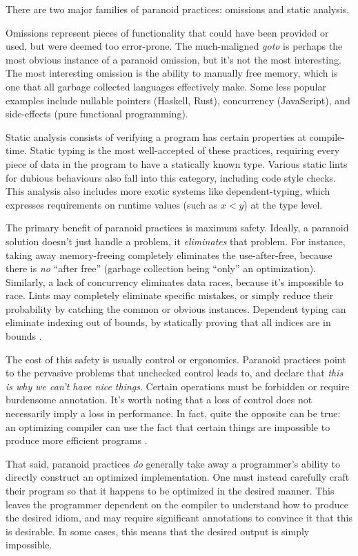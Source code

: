 There are two major families of paranoid practices: omissions and static analysis.

Omissions represent pieces of functionality that could have been provided or
used, but were deemed too error-prone. The much-maligned \emph{goto} is perhaps
the most obvious instance of a paranoid omission, but it's not the most
interesting. The most interesting omission is the ability to manually free memory,
which is one that all garbage collected languages effectively make.
Some less popular examples include nullable pointers (Haskell, Rust),
concurrency (JavaScript), and side-effects (pure functional programming).

Static analysis consists of verifying a program has certain properties at
compile-time. Static typing is the most well-accepted of these practices,
requiring every piece of data in the program to have a statically known type.
Various static lints for dubious behaviours also fall into this category,
including code style checks. This analysis also includes more exotic systems
like dependent-typing, which expresses requirements on runtime values (such as
$x < y$) at the type level.

The primary benefit of paranoid practices is maximum safety. Ideally, a paranoid
solution doesn't just handle a problem, it \emph{eliminates} that problem. For
instance, taking away memory-freeing completely eliminates the use-after-free,
because there is \emph{no} ``after free'' (garbage collection being ``only'' an
optimization). Similarly, a lack of concurrency eliminates data races, because
it's impossible to race. Lints may completely eliminate specific mistakes, or
simply reduce their probability by catching the common or obvious instances.
Dependent typing can eliminate indexing out of bounds, by statically proving
that all indices are in bounds \cite{xi1998eliminating}.

The cost of this safety is usually control or ergonomics. Paranoid practices
point to the pervasive problems that unchecked control leads to, and declare
that \emph{this is why we can't have nice things}. Certain operations must be
forbidden or require burdensome annotation. It's worth noting that a loss of
control does not necessarily imply a loss in performance. In fact, quite the
opposite can be true: an optimizing compiler can use the fact that certain
things are impossible to produce more efficient programs
\cite{coutts2007stream}.

That said, paranoid practices \emph{do} generally take away a programmer's ability to
directly construct an optimized implementation. One must instead carefully craft
their program so that it happens to be optimized in the desired manner. This
leaves the programmer dependent on the compiler to understand how to produce the
desired idiom, and may require significant annotations to convince it that this
is desirable. In some cases, this means that the desired output is simply
impossible.

